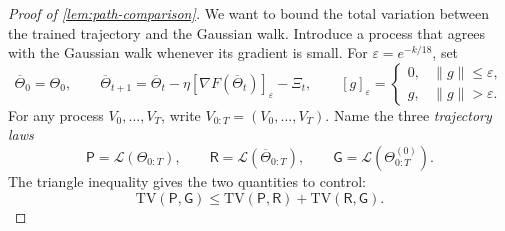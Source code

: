 \documentclass[11pt,twoside]{article}
\newcommand{\Law}{\mathcal L}
\newcommand{\TV}{\mathrm{TV}}
\theoremstyle{definition}
\theoremstyle{remark}
\begin{document}
\begin{proof}[Proof of \cref{lem:path-comparison}]
We want to bound the total variation between the trained trajectory and the
Gaussian walk. Introduce a process that agrees with the Gaussian walk
whenever its gradient is small. For $\varepsilon=e^{-k/18}$, set
\begin{equation}
\overline\Theta_0=\Theta_0,
\qquad
\overline\Theta_{t+1}
=\overline\Theta_t-\eta[\nabla F(\overline\Theta_t)]_\varepsilon-\Xi_t,
\qquad
[g]_\varepsilon=
\begin{cases}
0,&\|g\|\le\varepsilon,\\
g,&\|g\|>\varepsilon.
\end{cases}
\label{eq:clipped-process}
\end{equation}
For any process $V_0,\ldots,V_T$, write $V_{0:T}=(V_0,\ldots,V_T)$.
Name the three \emph{trajectory laws}
\[
\mathsf P=\Law(\Theta_{0:T}),
\qquad
\mathsf R=\Law(\overline\Theta_{0:T}),
\qquad
\mathsf G=\Law(\Theta^{(0)}_{0:T}).
\]
The triangle inequality gives the two quantities to control:
\begin{equation}
\TV(\mathsf P,\mathsf G)
\le\TV(\mathsf P,\mathsf R)+\TV(\mathsf R,\mathsf G).
\label{eq:path-triangle}
\end{equation}


\end{proof}
\end{document}
